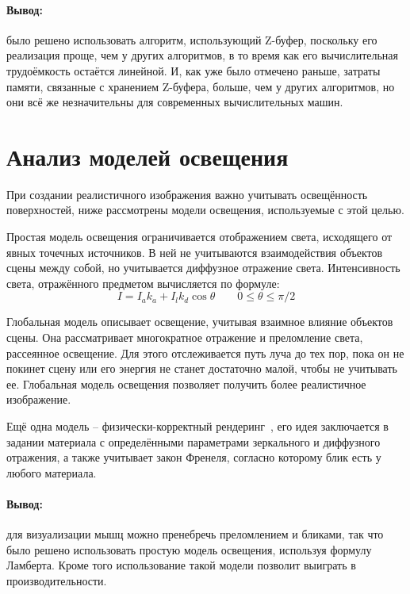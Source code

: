\paragraph{Вывод:} было решено использовать алгоритм, использующий Z-буфер, поскольку его реализация проще, чем у других алгоритмов, в то время как его вычислительная трудоёмкость остаётся линейной. И, как уже было отмечено раньше, затраты памяти, связанные с хранением Z-буфера, больше, чем у других алгоритмов, но они всё же незначительны для современных вычислительных машин.


\section{Анализ моделей освещения}
\label{sec:light}
При создании реалистичного изображения важно учитывать освещённость поверхностей, ниже рассмотрены модели освещения, используемые с этой целью.
\par Простая модель освещения ограничивается отображением света, исходящего от явных точечных источников. В ней не учитываются взаимодействия объектов сцены между собой, но учитывается диффузное отражение света. Интенсивность света, отражённого предметом вычисляется по формуле:
\begin{equation}\label{lambert}
I = I_{a}k_{a} + I_{l}k_{d}\cos \theta \qquad 0\leq\theta\leq\pi/2
\end{equation}
\par Глобальная модель описывает освещение, учитывая взаимное влияние объектов сцены. Она рассматривает многократное отражение и преломление света, рассеянное освещение. Для этого отслеживается путь луча до тех пор, пока он не покинет сцену или его энергия не станет достаточно малой, чтобы не учитывать ее. Глобальная модель освещения позволяет получить более реалистичное изображение.
\par Ещё одна модель -- физически-корректный рендеринг~\cite{pbr}, его идея заключается в задании материала с определёнными параметрами зеркального и диффузного отражения, а также учитывает закон Френеля, согласно которому блик есть у любого материала.
\paragraph{Вывод:} для визуализации мышц можно пренебречь преломлением и бликами, так что было решено использовать простую модель освещения, используя формулу Ламберта. Кроме того использование такой модели позволит выиграть в производительности.

